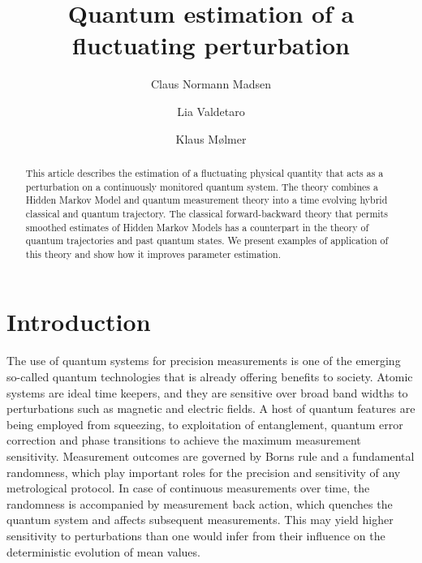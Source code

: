 \documentclass[aps,pra,twocolumn,groupedaddress,showpacs]{revtex4}
\begin{document}
\title{Quantum estimation of a fluctuating perturbation}

\author{Claus Normann Madsen}
\author{Lia Valdetaro}
\author{Klaus M\o lmer}


\begin{abstract}

This article describes the estimation of a fluctuating physical quantity that acts as a perturbation on a continuously monitored quantum system. The theory combines a Hidden Markov Model and quantum measurement theory into a time evolving hybrid classical and quantum trajectory. The classical forward-backward theory that permits smoothed estimates of Hidden Markov Models has a counterpart in the theory of quantum trajectories and past quantum states. We present examples of application of this theory and show how it improves parameter estimation.


\end{abstract}

\maketitle

\section{Introduction}

The use of quantum systems for precision measurements is one of the emerging so-called quantum technologies that is already offering benefits to society. Atomic systems are ideal time keepers, and they are sensitive over broad band widths to perturbations such as magnetic and electric fields. A host of quantum features are being employed from squeezing, to exploitation of entanglement, quantum error correction  and phase transitions to achieve the maximum measurement sensitivity. Measurement outcomes are governed by Borns rule and a fundamental randomness, which play important roles for the precision and sensitivity of any metrological protocol. In case of continuous measurements over time, the randomness is accompanied by measurement back action, which quenches the quantum system and affects subsequent measurements. This may yield higher sensitivity to perturbations than one would infer from their influence on the deterministic evolution of mean values.
\end{document}
